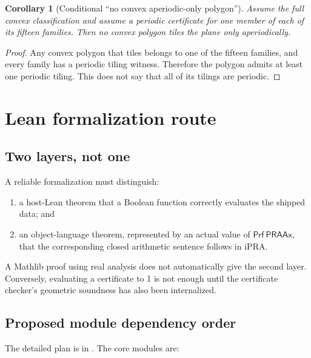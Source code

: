 \documentclass[11pt]{article}
\newtheorem{corollary}[theorem]{Corollary}
\theoremstyle{remark}
\newcommand{\ipra}{\mathrm{iPRA}}
\newcommand{\code}[1]{\texttt{\detokenize{#1}}}
\newcommand{\Prf}{\mathsf{Prf}}
\newcommand{\PRAAx}{\mathsf{PRAAx}}
\begin{document}
\begin{corollary}[Conditional ``no convex aperiodic-only polygon'']
Assume the full convex classification and assume a periodic certificate for
one member of each of its fifteen families.  Then no convex polygon tiles the
plane only aperiodically.
\end{corollary}

\begin{proof}
Any convex polygon that tiles belongs to one of the fifteen families, and every
family has a periodic tiling witness.  Therefore the polygon admits at least
one periodic tiling.  This does not say that all of its tilings are periodic.
\end{proof}

\section{Lean formalization route}
\label{sec:lean}

\subsection{Two layers, not one}

A reliable formalization must distinguish:

\begin{enumerate}
\item a host-Lean theorem that a Boolean function correctly evaluates the
shipped data; and
\item an object-language theorem, represented by an actual value of
\(\Prf\ \PRAAx\), that the corresponding closed arithmetic sentence follows
in \(\ipra\).
\end{enumerate}

A Mathlib proof using real analysis does not automatically give the second
layer.  Conversely, evaluating a certificate to 1 is not enough until the
certificate checker's geometric soundness has also been internalized.

\subsection{Proposed module dependency order}

The detailed plan is in \code{FORMALIZATION_PLAN.md}.  The core modules are:
\end{document}
